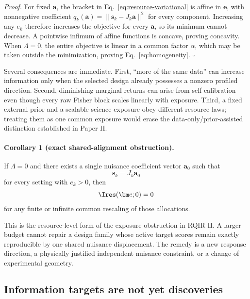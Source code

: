 \emph{Proof.}
For fixed $\bm a$, the bracket in Eq.~\eqref{eq:resource-variational} is affine in $\bm e$, with nonnegative coefficient
$q_k(\bm a)=\|\bm s_k-J_k\bm a\|^2$ for every component. Increasing any $e_k$ therefore increases the objective for every $\bm a$, so its minimum cannot decrease. A pointwise infimum of affine functions is concave, proving concavity. When $\Lambda=0$, the entire objective is linear in a common factor $\alpha$, which may be taken outside the minimization, proving Eq.~\eqref{eq:homogeneity}. \hfill$\square$

Several consequences are immediate. First, ``more of the same data'' can increase information only when the selected design already possesses a nonzero profiled direction. Second, diminishing marginal returns can arise from self-calibration even though every raw Fisher block scales linearly with exposure. Third, a fixed external prior and a scalable science exposure obey different resource laws; treating them as one common exposure would erase the data-only/prior-assisted distinction established in Paper II.

\paragraph*{Corollary 1 (exact shared-alignment obstruction).}
If $\Lambda=0$ and there exists a single nuisance coefficient vector $\bm a_0$ such that
\begin{equation}
 \bm s_k=J_k\bm a_0
\label{eq:shared-alignment}
\end{equation}
for every setting with $e_k>0$, then
\begin{equation}
 \Ires(\bm e;0)=0
\end{equation}
for any finite or infinite common rescaling of those allocations.

This is the resource-level form of the exposure obstruction in RQIR II. A larger budget cannot repair a design family whose active target scores remain exactly reproducible by one shared nuisance displacement. The remedy is a new response direction, a physically justified independent nuisance constraint, or a change of experimental geometry.

\subsection{Information targets are not yet discoveries}

